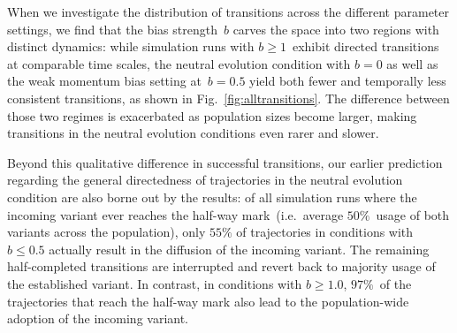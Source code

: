 When we investigate the distribution of transitions across the different parameter settings, we find that the bias strength~$b$ carves the space into two regions with distinct dynamics: while simulation runs with $b\ge1$~exhibit directed transitions at comparable time scales, the neutral evolution condition with $b=0$ as well as the weak momentum bias setting at~$b=0.5$ yield both fewer and temporally less consistent transitions, as shown in Fig.~\ref{fig:alltransitions}. The difference between those two regimes is exacerbated as population sizes become larger, making transitions in the neutral evolution conditions even rarer and slower.

Beyond this qualitative difference in successful transitions, our earlier prediction regarding the general directedness of trajectories in the neutral evolution condition are also borne out by the results: of all simulation runs where the incoming variant ever reaches the half-way mark~(i.e.~average $50\%$~usage of both variants across the population), only $55\%$ of trajectories in conditions with $b\le0.5$ actually result in the diffusion of the incoming variant. The remaining half-completed transitions are interrupted and revert back to majority usage of the established variant. In contrast, in conditions with $b\ge1.0$, $97\%$~of the trajectories that reach the half-way mark also lead to the population-wide adoption of the incoming variant.

